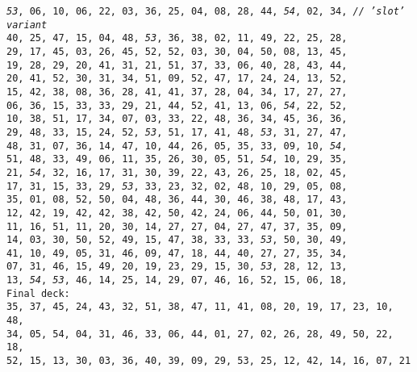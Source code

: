 \documentclass[a4paper,parskip,12pt]{scrartcl}
\begin{document}
   \texttt{\emph{53}, 06, 10, 06, 22, 03, 36, 25, 04, 08, 28, 44, \emph{54}, 02, 34, \emph{// 'slot' variant}}
\\ \texttt{40, 25, 47, 15, 04, 48, \emph{53}, 36, 38, 02, 11, 49, 22, 25, 28,}
\\ \texttt{29, 17, 45, 03, 26, 45, 52, 52, 03, 30, 04, 50, 08, 13, 45,}
\\ \texttt{19, 28, 29, 20, 41, 31, 21, 51, 37, 33, 06, 40, 28, 43, 44,}
\\ \texttt{20, 41, 52, 30, 31, 34, 51, 09, 52, 47, 17, 24, 24, 13, 52,}
\\ \texttt{15, 42, 38, 08, 36, 28, 41, 41, 37, 28, 04, 34, 17, 27, 27,}
\\ \texttt{06, 36, 15, 33, 33, 29, 21, 44, 52, 41, 13, 06, \emph{54}, 22, 52,}
\\ \texttt{10, 38, 51, 17, 34, 07, 03, 33, 22, 48, 36, 34, 45, 36, 36,}
\\ \texttt{29, 48, 33, 15, 24, 52, \emph{53}, 51, 17, 41, 48, \emph{53}, 31, 27, 47,}
\\ \texttt{48, 31, 07, 36, 14, 47, 10, 44, 26, 05, 35, 33, 09, 10, \emph{54},}
\\ \texttt{51, 48, 33, 49, 06, 11, 35, 26, 30, 05, 51, \emph{54}, 10, 29, 35,}
\\ \texttt{21, \emph{54}, 32, 16, 17, 31, 30, 39, 22, 43, 26, 25, 18, 02, 45,}
\\ \texttt{17, 31, 15, 33, 29, \emph{53}, 33, 23, 32, 02, 48, 10, 29, 05, 08,}
\\ \texttt{35, 01, 08, 52, 50, 04, 48, 36, 44, 30, 46, 38, 48, 17, 43,}
\\ \texttt{12, 42, 19, 42, 42, 38, 42, 50, 42, 24, 06, 44, 50, 01, 30,}
\\ \texttt{11, 16, 51, 11, 20, 30, 14, 27, 27, 04, 27, 47, 37, 35, 09,}
\\ \texttt{14, 03, 30, 50, 52, 49, 15, 47, 38, 33, 33, \emph{53}, 50, 30, 49,}
\\ \texttt{41, 10, 49, 05, 31, 46, 09, 47, 18, 44, 40, 27, 27, 35, 34,}
\\ \texttt{07, 31, 46, 15, 49, 20, 19, 23, 29, 15, 30, \emph{53}, 28, 12, 13,}
\\ \texttt{13, \emph{54}, \emph{53}, 46, 14, 25, 14, 29, 07, 46, 16, 52, 15, 06, 18,}
\\ \texttt{Final deck: \\ 35, 37, 45, 24, 43, 32, 51, 38, 47, 11, 41, 08, 20, 19, 17, 23, 10, 48, \\ 34, 05, 54, 04, 31, 46, 33, 06, 44, 01, 27, 02, 26, 28, 49, 50, 22, 18, \\ 52, 15, 13, 30, 03, 36, 40, 39, 09, 29, 53, 25, 12, 42, 14, 16, 07, 21}
\end{document}

